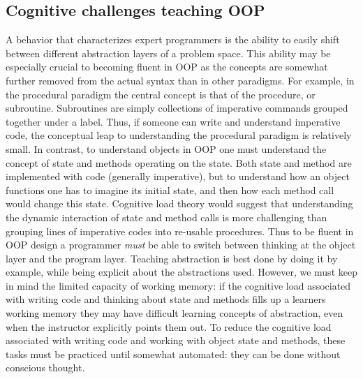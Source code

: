 \documentclass[12pt]{article}
\begin{document}
\subsection{Cognitive challenges teaching OOP}
A behavior that characterizes expert programmers is the ability to
easily shift between different abstraction layers of a problem
space\autocite{armoni_teaching_2013}. This ability may be especially
crucial to becoming fluent in OOP as the concepts are somewhat further
removed from the actual syntax than in other paradigms. For example,
in the procedural paradigm the central concept is that of the
procedure, or subroutine. Subroutines are simply collections of
imperative commands grouped together under a label. Thus, if someone
can write and understand imperative code, the conceptual leap to
understanding the procedural paradigm is relatively small. In
contrast, to understand objects in OOP one must understand the concept
of state and methods operating on the state. Both state and method are
implemented with code (generally imperative), but to understand how an
object functions one has to imagine its initial state, and then how
each method call would change this state. Cognitive load theory would
suggest that understanding the dynamic interaction of state and method
calls is more challenging than grouping lines of imperative codes into
re-usable procedures. Thus to be fluent in OOP design a programmer
\emph{must} be able to switch between thinking at the object layer and
the program layer. Teaching abstraction is best done by doing it by
example, while being explicit about the abstractions
used\autocite{armoni_teaching_2013}. However, we must keep in mind the
limited capacity of working memory: if the cognitive load associated
with writing code and thinking about state and methods fills up a
learners working memory they may have difficult learning concepts of
abstraction, even when the instructor explicitly points them out. To
reduce the cognitive load associated with writing code and working
with object state and methods, these tasks must be practiced until
somewhat automated: they can be done without conscious
thought\autocite{ambrose_chapter_2010}.
\end{document}
